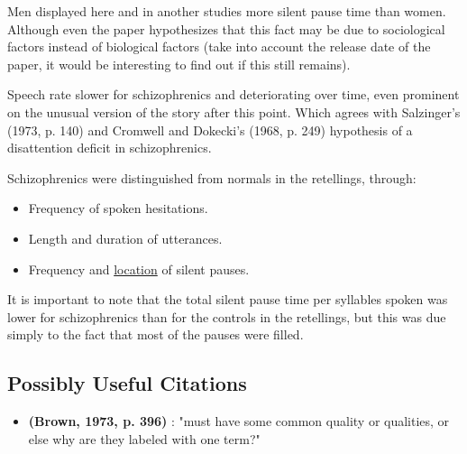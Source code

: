 \documentclass{Paper_Summary}
\begin{document}
    Men displayed here and in another studies more silent pause time than women. Although even the paper hypothesizes that this fact may be due to sociological factors instead of biological factors (take into account the release date of the paper, it would be interesting to find out if this still remains).

    Speech rate slower for schizophrenics and deteriorating over time, even prominent on the unusual version of the story after this point. Which agrees with Salzinger's (1973, p. 140) and Cromwell and Dokecki's (1968, p. 249) hypothesis of a disattention deficit in schizophrenics.

    Schizophrenics were distinguished from normals in the retellings, through:
    \begin{itemize}
        \item Frequency of spoken hesitations.
        \item Length and duration of utterances.
        \item Frequency and \underline{location} of silent pauses.
    \end{itemize}

    It is important to note that the total silent pause time per syllables spoken was lower for schizophrenics than for the controls in the retellings, but this was due simply to the fact that most of the pauses were filled.

\breakline

\begin{center}
    \section*{Possibly Useful Citations}
\end{center}

    \begin{itemize}
        \item \textbf{(Brown, 1973, p. 396)} : "must have some common quality or qualities, or else why are they labeled with one term?"
    \end{itemize}
\end{document}
